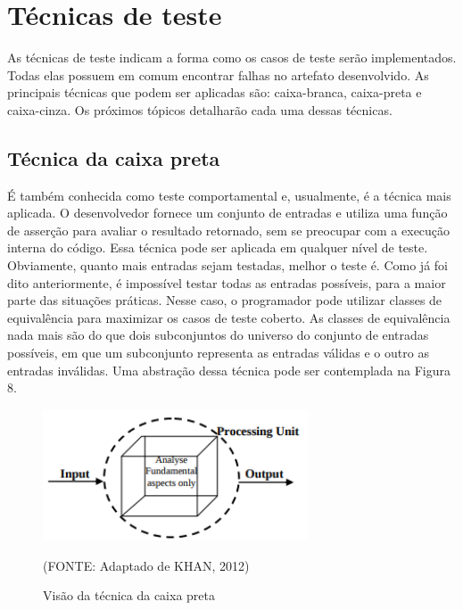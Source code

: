 \documentclass[
    12pt,       %
    openright,      %
    twoside,      %
    a4paper,      %
    english,      %
    french,       %
    spanish,      %
    brazil,       %
    ]{abntex2}
\begin{document}
      \section{Técnicas de teste}
          As técnicas de teste indicam a forma como os casos de teste serão implementados.
          Todas elas possuem em comum encontrar falhas no artefato desenvolvido. As principais
          técnicas que podem ser aplicadas são: caixa-branca, caixa-preta e caixa-cinza. Os próximos
          tópicos detalharão cada uma dessas técnicas.

          \subsection{Técnica da caixa preta}
              É também conhecida como teste comportamental e, usualmente, é a técnica mais aplicada.
              O desenvolvedor fornece um conjunto de entradas e utiliza uma função de asserção
              para avaliar o resultado retornado, sem se preocupar com a execução interna do código.
              Essa técnica pode ser aplicada em qualquer nível de teste. Obviamente, quanto mais
              entradas sejam testadas, melhor o teste é. Como já foi dito anteriormente, é
              impossível testar todas as entradas possíveis, para a maior parte das situações práticas. Nesse caso, o programador pode utilizar
              classes de equivalência para maximizar os casos de teste coberto. As classes de equivalência
              nada mais são do que dois subconjuntos do universo do conjunto de entradas possíveis,
              em que um subconjunto representa as entradas válidas e o outro as entradas inválidas.
              Uma abstração dessa técnica pode ser contemplada na Figura 8.

              \begin{figure}[htbp]
                  \begin{center}
                      \includegraphics[width=0.7\textwidth]{img/blackbox.png}
                  \end{center}
              \caption{\label{fig:passaro}Visão da técnica da caixa preta}
              \begin{center}(FONTE: Adaptado de KHAN, 2012)\end{center}
              \end{figure}
\end{document}
